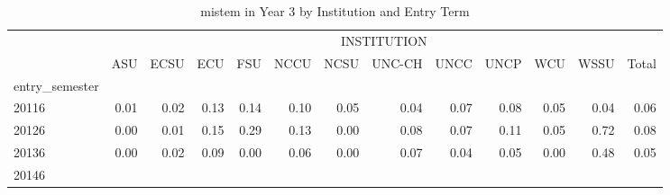\begin{table}[!h]
\caption{mistem in Year 3 by Institution and Entry Term}
\centering
\begin{tabular}{lllllllllllll}
\cline{1-13}
\multicolumn{1}{c}{} &
  \multicolumn{12}{|c}{INSTITUTION} \\
\multicolumn{1}{c}{} &
  \multicolumn{1}{|r}{ASU} &
  \multicolumn{1}{r}{ECSU} &
  \multicolumn{1}{r}{ECU} &
  \multicolumn{1}{r}{FSU} &
  \multicolumn{1}{r}{NCCU} &
  \multicolumn{1}{r}{NCSU} &
  \multicolumn{1}{r}{UNC-CH} &
  \multicolumn{1}{r}{UNCC} &
  \multicolumn{1}{r}{UNCP} &
  \multicolumn{1}{r}{WCU} &
  \multicolumn{1}{r}{WSSU} &
  \multicolumn{1}{r}{Total} \\
\cline{1-13}
\multicolumn{1}{l}{entry\_semester} &
  \multicolumn{1}{|r}{} &
  \multicolumn{1}{r}{} &
  \multicolumn{1}{r}{} &
  \multicolumn{1}{r}{} &
  \multicolumn{1}{r}{} &
  \multicolumn{1}{r}{} &
  \multicolumn{1}{r}{} &
  \multicolumn{1}{r}{} &
  \multicolumn{1}{r}{} &
  \multicolumn{1}{r}{} &
  \multicolumn{1}{r}{} &
  \multicolumn{1}{r}{} \\
\multicolumn{1}{l}{\hspace{1em}20116} &
  \multicolumn{1}{|r}{0.01} &
  \multicolumn{1}{r}{0.02} &
  \multicolumn{1}{r}{0.13} &
  \multicolumn{1}{r}{0.14} &
  \multicolumn{1}{r}{0.10} &
  \multicolumn{1}{r}{0.05} &
  \multicolumn{1}{r}{0.04} &
  \multicolumn{1}{r}{0.07} &
  \multicolumn{1}{r}{0.08} &
  \multicolumn{1}{r}{0.05} &
  \multicolumn{1}{r}{0.04} &
  \multicolumn{1}{r}{0.06} \\
\multicolumn{1}{l}{\hspace{1em}20126} &
  \multicolumn{1}{|r}{0.00} &
  \multicolumn{1}{r}{0.01} &
  \multicolumn{1}{r}{0.15} &
  \multicolumn{1}{r}{0.29} &
  \multicolumn{1}{r}{0.13} &
  \multicolumn{1}{r}{0.00} &
  \multicolumn{1}{r}{0.08} &
  \multicolumn{1}{r}{0.07} &
  \multicolumn{1}{r}{0.11} &
  \multicolumn{1}{r}{0.05} &
  \multicolumn{1}{r}{0.72} &
  \multicolumn{1}{r}{0.08} \\
\multicolumn{1}{l}{\hspace{1em}20136} &
  \multicolumn{1}{|r}{0.00} &
  \multicolumn{1}{r}{0.02} &
  \multicolumn{1}{r}{0.09} &
  \multicolumn{1}{r}{0.00} &
  \multicolumn{1}{r}{0.06} &
  \multicolumn{1}{r}{0.00} &
  \multicolumn{1}{r}{0.07} &
  \multicolumn{1}{r}{0.04} &
  \multicolumn{1}{r}{0.05} &
  \multicolumn{1}{r}{0.00} &
  \multicolumn{1}{r}{0.48} &
  \multicolumn{1}{r}{0.05} \\
\multicolumn{1}{l}{\hspace{1em}20146} &

\end{tabular}
\end{table}
